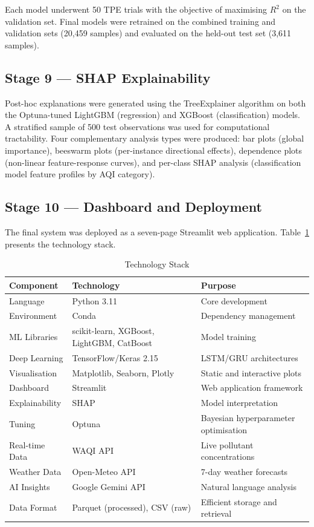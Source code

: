 \documentclass[12pt,a4paper]{report}
\begin{document}
Each model underwent 50 TPE trials with the objective of maximising $R^2$ on the validation set. Final models were retrained on the combined training and validation sets (20,459 samples) and evaluated on the held-out test set (3,611 samples).

\subsection{Stage 9 --- SHAP Explainability}

Post-hoc explanations were generated using the TreeExplainer algorithm on both the Optuna-tuned LightGBM (regression) and XGBoost (classification) models. A stratified sample of 500 test observations was used for computational tractability. Four complementary analysis types were produced: bar plots (global importance), beeswarm plots (per-instance directional effects), dependence plots (non-linear feature-response curves), and per-class SHAP analysis (classification model feature profiles by AQI category).

\subsection{Stage 10 --- Dashboard and Deployment}

The final system was deployed as a seven-page Streamlit web application. Table~\ref{tab:tech_stack} presents the technology stack.

\begin{table}[H]
\centering
\caption{Technology Stack}
\label{tab:tech_stack}
\begin{tabular}{|l|l|p{6cm}|}
\hline
\textbf{Component} & \textbf{Technology} & \textbf{Purpose} \\
\hline
Language & Python 3.11 & Core development \\
\hline
Environment & Conda & Dependency management \\
\hline
ML Libraries & scikit-learn, XGBoost, LightGBM, CatBoost & Model training \\
\hline
Deep Learning & TensorFlow/Keras 2.15 & LSTM/GRU architectures \\
\hline
Visualisation & Matplotlib, Seaborn, Plotly & Static and interactive plots \\
\hline
Dashboard & Streamlit & Web application framework \\
\hline
Explainability & SHAP & Model interpretation \\
\hline
Tuning & Optuna & Bayesian hyperparameter optimisation \\
\hline
Real-time Data & WAQI API & Live pollutant concentrations \\
\hline
Weather Data & Open-Meteo API & 7-day weather forecasts \\
\hline
AI Insights & Google Gemini API & Natural language analysis \\
\hline
Data Format & Parquet (processed), CSV (raw) & Efficient storage and retrieval \\
\hline
\end{tabular}
\end{table}
\end{document}
